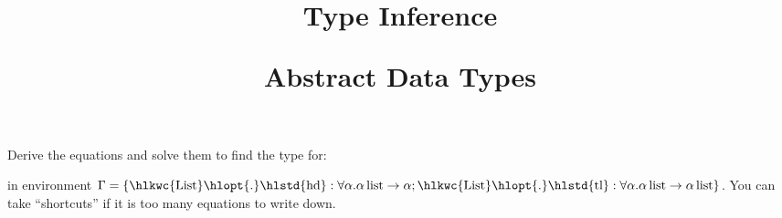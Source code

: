 \documentclass{article}
\newcommand{\tmop}[1]{\ensuremath{\operatorname{#1}}}
\begin{document}
{}

{\title{Type Inference

Abstract Data Types}}

\begin{exercise}
  Derive the equations and solve them to find the type for:
  
  {}{}{\hlopt{=
  }}{}{}{}{\hlopt{(}}{}{}{}{\hlopt{) }}{}{}{\hlopt{(}}{}{\hlopt{::}}{}{\hlopt{::[]),
  }}{}{\hlopt{(}}{}{\hlopt{::}}{}{\hlopt{::[])}}
  
  in environment $\Gamma = \left\{
  \text{{\hlkwc{List}}{\hlopt{.}}{\hlstd{hd}}} : \forall \alpha . \alpha
  \tmop{list} \rightarrow \alpha ;
  \text{{\hlkwc{List}}{\hlopt{.}}{\hlstd{tl}}} : \forall \alpha . \alpha
  \tmop{list} \rightarrow \alpha \tmop{list} \right\}$. You can take
  ``shortcuts'' if it is too many equations to write down.
\end{exercise}
\end{document}
